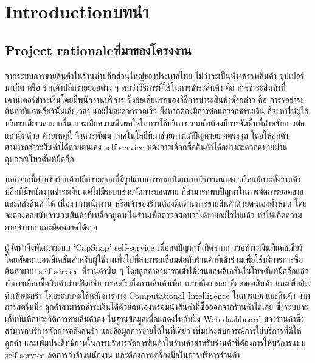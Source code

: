 \chapter{\ifenglish Introduction\else บทนำ\fi}

\section{\ifenglish Project rationale\else ที่มาของโครงงาน\fi}
\par จากระบบการขายสินค้าในร้านค้าปลีกส่วนใหญ่ของประเทศไทย ไม่ว่าจะเป็นห้างสรรพสินค้า ซุปเปอร์มาเก็ต หรือ
ร้านค้าปลีกรายย่อยต่าง ๆ พบว่าวิธีการที่ใช้ในการชำระสินค้า คือ การชำระสินค้าที่เคาน์เตอร์ชำระเงินโดยมีพนักงานบริการ 
ซึ่งข้อเสียแรกของวิธีการชำระสินค้าดังกล่าว คือ การรอชำระสินค้าที่แคชเชียร์นั้นเสียเวลา และไม่สะดวกรวดเร็ว 
ยิ่งหากต้องมีการต่อแถวรอชำระเงิน ก็จะทำให้ผู้ใช้บริการเสียเวลามากขึ้น และเสียความพึงพอใจในการใช้บริการ 
รวมถึงต้องมีการจัดพื้นที่สำหรับการต่อแถวอีกด้วย ด้วยเหตุนี้ จึงควรพัฒนาเทคโนโลยีที่มาช่วยการแก้ปัญหาอย่างตรงจุด 
โดยให้ลูกค้าสามารถชำระสินค้าได้ด้วยตนเอง self-service หลังการเลือกซื้อสินค้าได้อย่างสะดวกสบายผ่านอุปกรณ์โทรศัพท์มือถือ 
\par นอกจากนี้สำหรับร้านค้าปลีกรายย่อยที่มีรูปแบบการขายเป็นแบบบริการตนเอง หรือแม้กระทั่งร้านค้าปลีกที่มีพนักงานชำระเงิน
แต่ไม่มีระบบช่วยจัดการยอดขาย ก็สามารถพบปัญหาในการจัดการยอดขาย และคลังสินค้าได้ เนื่องจากพนักงาน
 หรือเจ้าของร้านต้องติดตามการขายสินค้าด้วยตนเองทั้งหมด โดยจะต้องคอยนับจํานวนสินค้าที่เหลืออยู่ภายในร้านเพื่อตรวจสอบว่าได้ขายอะไรไปแล้ว
  ทำให้เกิดความยากลำบาก และผิดพลาดได้ง่าย 
\par ผู้จัดทําจึงพัฒนาระบบ ‘CapSnap’ self-service เพื่อลดปัญหาที่เกิดจากการรอชำระเงินที่แคชเชียร์ 
โดยพัฒนาแอพลิเคชันสำหรับผู้ใช้งานทั่วไปที่สามารถเชื่อมต่อกับร้านค้าที่เข้าร่วมเพื่อใช้บริการการซื้อสินค้าแบบ self-service 
ที่ร้านค้านั้น ๆ โดยลูกค้าสามารถเข้าใช้งานแอพลิเคชันในโทรศัพท์มือถือแล้วทำการเลือกซื้อสินค้าผ่านฟังก์ชันการสตรีมมิ่งภาพสินค้าเพื่อ
ทราบถึงรายละเอียดของสินค้า และเพิ่มสินค้าเข้าตะกร้า โดยระบบจะใช้หลักการทาง Computational Intelligence ในการแยกแยะสินค้า
จากการสตรีมมิ่ง ลูกค้าสามารถชำระเงินได้ด้วยตนเองพร้อมนำสินค้าที่ซื้อออกจากร้านค้าได้เลย ซึ่งระบบจะเก็บบันทึกประวัติการขายสินค้าลง
ในฐานข้อมูลเพื่อแสดงให้กับฝั่ง Web dashboard ของร้านค้าซึ่งสามารถบริการจัดการคลังสินข้า และข้อมูลการขายได้ในที่เดียว 
เพิ่มประสบการณ์การใช้บริการที่ดีให้ลูกค้า และเพิ่มประสิทธิภาพในการบริหารจัดการสินค้าในร้านค้าสำหรับร้านค้าที่ต้องการให้บริการแบบ
 self-service ลดการว่าจ้างพนักงาน และต้องการเครื่องมือในการบริหารร้านค้า 
 


